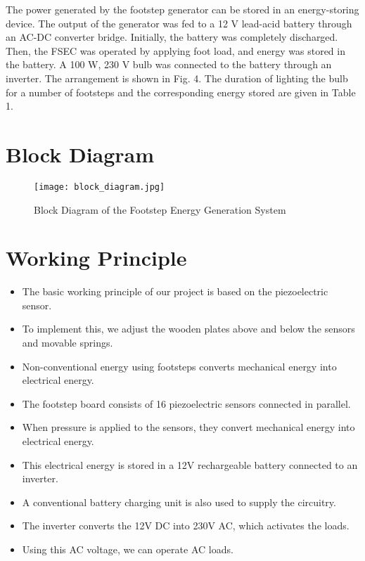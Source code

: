 \documentclass[12pt]{article}
\begin{document}
The power generated by the footstep generator can be stored in an energy-storing device. The output of the generator was fed to a 12 V lead-acid battery through an AC-DC converter bridge. Initially, the battery was completely discharged. Then, the FSEC was operated by applying foot load, and energy was stored in the battery. A 100 W, 230 V bulb was connected to the battery through an inverter. The arrangement is shown in Fig. 4. The duration of lighting the bulb for a number of footsteps and the corresponding energy stored are given in Table 1.

 \newpage 

\section*{Block Diagram}

\begin{figure}[h!]
    \centering
    \texttt{[image: block\_diagram.jpg]} %
    \caption{Block Diagram of the Footstep Energy Generation System}
\end{figure}

\section*{Working Principle}

\begin{itemize}[leftmargin=1.5cm]
    \item The basic working principle of our project is based on the piezoelectric sensor.
    \item To implement this, we adjust the wooden plates above and below the sensors and movable springs.
    \item Non-conventional energy using footsteps converts mechanical energy into electrical energy.
    \item The footstep board consists of 16 piezoelectric sensors connected in parallel.
    \item When pressure is applied to the sensors, they convert mechanical energy into electrical energy.
    \item This electrical energy is stored in a 12V rechargeable battery connected to an inverter.
    \item A conventional battery charging unit is also used to supply the circuitry.
    \item The inverter converts the 12V DC into 230V AC, which activates the loads.
    \item Using this AC voltage, we can operate AC loads.
\end{itemize}
\end{document}
